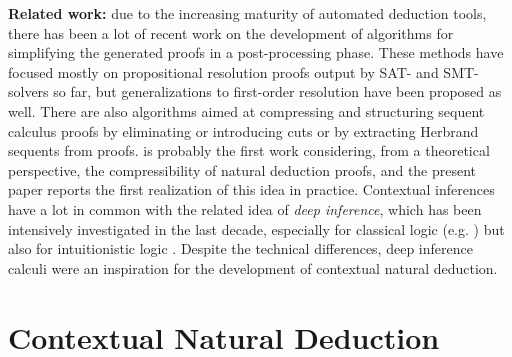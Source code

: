 \documentclass{llncs}
\begin{document}
\noindent\textbf{Related work:} due to the increasing maturity of automated deduction tools, there has been a lot of recent work on the development of algorithms for simplifying the generated proofs in a post-processing phase. These methods have focused mostly on propositional resolution proofs output by SAT- and SMT-solvers so far, %
but generalizations to first-order resolution have been proposed as well. %
There are also algorithms aimed at compressing and structuring sequent calculus proofs by eliminating or introducing cuts \cite{Woltzenlogel-Paleo2010Atomic-Cut-Introduction-by-Resolution:-Proof-Structuring-and-Compression,HetzlLeitschWeller2012Towards-Algorithmic-Cut-Introduction} or by extracting Herbrand sequents from proofs.%
\cite{NDc} is probably the first work considering, from a theoretical perspective, the compressibility of natural deduction proofs, and the present paper reports the first realization of this idea in practice. Contextual inferences have a lot in common with the related idea of \emph{deep inference}, which has been intensively investigated in the last decade, especially for classical logic (e.g. \cite{Brunnler2003Atomic-Cut-Elimination-for-classical-Logic,BruscoliGuglielmiGundersenParigot2010A-Quasipolynomial-Cut-Elimination-Procedure-in-Deep-Inference-via-Atomic-Flows-and-Threshold-Formulae,BruscoliGuglielmi2009On-the-Proof-Complexity-of-Deep-Inference,Guglielmi1999A-System-of-Interaction-and-Structure}) but also for intuitionistic logic \cite{Tiu2006A-Local-System-for-Intuitionistic-Logic,BruennlerMcKinley2008An-Algorithmic-Interpretation-of-a-Deep-Inference-System,Guenot2011Nested-proof-search-as-reduction-in-the-Lambda-calculus}. Despite the technical differences, deep inference calculi were an inspiration for the development of contextual natural deduction.



\section{Contextual Natural Deduction}
\label{section:DeepND}

\newcommand{\CurryHoward}{\mathcal{I}}
\newcommand{\C}{\mathcal{C}}
\end{document}
